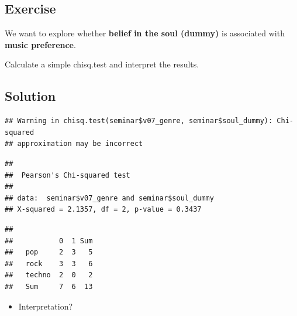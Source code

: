 \documentclass[
]{book}
\newenvironment{Shaded}{\begin{snugshade}}{\end{snugshade}}
\newcommand{\FunctionTok}[1]{\textcolor[rgb]{0.13,0.29,0.53}{\textbf{#1}}}
\newcommand{\NormalTok}[1]{#1}
\newcommand{\SpecialCharTok}[1]{\textcolor[rgb]{0.81,0.36,0.00}{\textbf{#1}}}
\providecommand{\tightlist}{%
  \setlength{\itemsep}{0pt}\setlength{\parskip}{0pt}}
\begin{document}
\subsection{\texorpdfstring{Exercise }{Exercise  }}\label{exercise-6}

We want to explore whether \textbf{belief in the soul (dummy)} is associated with \textbf{music preference}.

Calculate a simple chisq.test and interpret the results.

\subsection{\texorpdfstring{Solution }{Solution  }}\label{solution-10}

\begin{Shaded}
\end{Shaded}

\begin{verbatim}
## Warning in chisq.test(seminar$v07_genre, seminar$soul_dummy): Chi-squared
## approximation may be incorrect
\end{verbatim}

\begin{verbatim}
## 
##  Pearson's Chi-squared test
## 
## data:  seminar$v07_genre and seminar$soul_dummy
## X-squared = 2.1357, df = 2, p-value = 0.3437
\end{verbatim}

\begin{Shaded}
\end{Shaded}

\begin{verbatim}
##         
##           0  1 Sum
##   pop     2  3   5
##   rock    3  3   6
##   techno  2  0   2
##   Sum     7  6  13
\end{verbatim}

\begin{itemize}
\tightlist
\item
  Interpretation?
\end{itemize}
\end{document}
